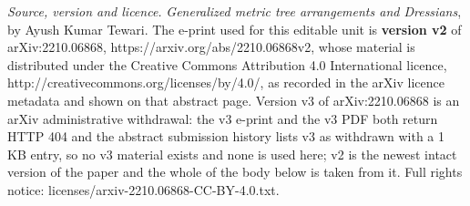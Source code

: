 \documentclass[10pt,a4paper]{amsart}
\theoremstyle{plain}
\theoremstyle{definition}
\numberwithin{subcase}{case}
\begin{document}
\maketitle
\noindent\emph{Source, version and licence.} \emph{Generalized metric tree arrangements and Dressians}, by Ayush Kumar Tewari. The e-print used for this editable unit is \textbf{version v2} of arXiv:2210.06868, https://arxiv.org/abs/2210.06868v2, whose material is distributed under the Creative Commons Attribution 4.0 International licence, http://creativecommons.org/licenses/by/4.0/, as recorded in the arXiv licence metadata and shown on that abstract page. Version v3 of arXiv:2210.06868 is an arXiv administrative withdrawal: the v3 e-print and the v3 PDF both return HTTP 404 and the abstract submission history lists v3 as withdrawn with a 1 KB entry, so no v3 material exists and none is used here; v2 is the newest intact version of the paper and the whole of the body below is taken from it. Full rights notice: licenses/arxiv-2210.06868-CC-BY-4.0.txt.
\par\smallskip
\end{document}
